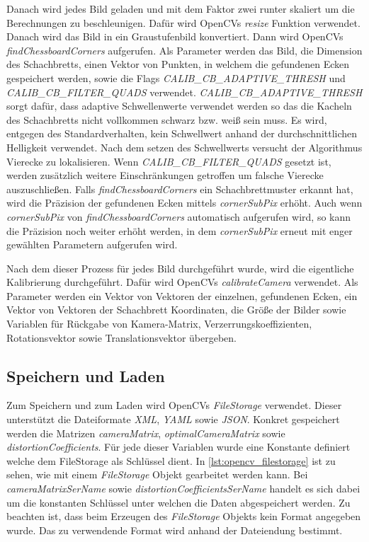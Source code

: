Danach wird jedes Bild geladen und mit dem Faktor zwei runter skaliert um die Berechnungen zu beschleunigen.
Dafür wird OpenCVs \emph{resize} Funktion verwendet.
Danach wird das Bild in ein Graustufenbild konvertiert.
Dann wird OpenCVs \emph{findChessboardCorners} aufgerufen.
Als Parameter werden das Bild, die Dimension des Schachbretts, einen Vektor von Punkten, in welchem die gefundenen Ecken gespeichert werden, sowie die Flags \emph{CALIB\_CB\_ADAPTIVE\_THRESH} und \emph{CALIB\_CB\_FILTER\_QUADS} verwendet.
\emph{CALIB\_CB\_ADAPTIVE\_THRESH} sorgt dafür, dass adaptive Schwellenwerte verwendet werden so das die Kacheln des Schachbretts nicht vollkommen schwarz bzw. weiß sein muss.
Es wird, entgegen des Standardverhalten, kein Schwellwert anhand der durchschnittlichen Helligkeit verwendet.
Nach dem setzen des Schwellwerts versucht der Algorithmus Vierecke zu lokalisieren.
Wenn \emph{CALIB\_CB\_FILTER\_QUADS} gesetzt ist, werden zusätzlich weitere Einschränkungen getroffen um falsche Vierecke auszuschließen.
Falls \emph{findChessboardCorners} ein Schachbrettmuster erkannt hat, wird die Präzision der gefundenen Ecken mittels \emph{cornerSubPix} erhöht.
Auch wenn \emph{cornerSubPix} von \emph{findChessboardCorners} automatisch aufgerufen wird, so kann die Präzision noch weiter erhöht werden, in dem \emph{cornerSubPix} erneut mit enger gewählten Parametern aufgerufen wird.

Nach dem dieser Prozess für jedes Bild durchgeführt wurde, wird die eigentliche Kalibrierung durchgeführt.
Dafür wird OpenCVs \emph{calibrateCamera} verwendet.
Als Parameter werden ein Vektor von Vektoren der einzelnen, gefundenen Ecken, ein Vektor von Vektoren der Schachbrett Koordinaten, die Größe der Bilder sowie Variablen für Rückgabe von Kamera-Matrix, Verzerrungskoeffizienten, Rotationsvektor sowie Translationsvektor übergeben.



\subsection{Speichern und Laden}\label{sec:calibration-load-save}
Zum Speichern und zum Laden wird OpenCVs \emph{FileStorage} verwendet.
Dieser unterstützt die Dateiformate \emph{XML}, \emph{YAML} sowie \emph{JSON}.
Konkret gespeichert werden die Matrizen \emph{cameraMatrix}, \emph{optimalCameraMatrix} sowie \emph{distortionCoefficients}.
Für jede dieser Variablen wurde eine Konstante definiert welche dem FileStorage als Schlüssel dient.
In \autoref{lst:opencv_filestorage} ist zu sehen, wie mit einem \emph{FileStorage} Objekt gearbeitet werden kann.
Bei \emph{cameraMatrixSerName} sowie \emph{distortionCoefficientsSerName} handelt es sich dabei um die konstanten Schlüssel unter welchen die Daten abgespeichert werden.
Zu beachten ist, dass beim Erzeugen des \emph{FileStorage} Objekts kein Format angegeben wurde.
Das zu verwendende Format wird anhand der Dateiendung bestimmt.

